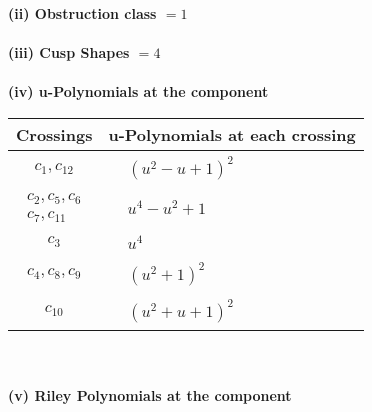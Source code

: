 \documentclass[1p]{elsarticle_modified}
\theoremstyle{definition}
\begin{document}
\flushleft \textbf{(ii) Obstruction class $= 1$}\\~\\
\flushleft \textbf{(iii) Cusp Shapes $= 4$}\\~\\
\newpage\renewcommand{\arraystretch}{1}
\flushleft \textbf{(iv) u-Polynomials at the component}\newline \\
\begin{tabular}{m{50pt}|m{274pt}}
Crossings & \hspace{64pt}u-Polynomials at each crossing \\
\hline $$\begin{aligned}c_{1},c_{12}\end{aligned}$$&$\begin{aligned}
&(u^2- u+1)^2
\end{aligned}$\\
\hline $$\begin{aligned}c_{2},c_{5},c_{6}\\c_{7},c_{11}\end{aligned}$$&$\begin{aligned}
&u^4- u^2+1
\end{aligned}$\\
\hline $$\begin{aligned}c_{3}\end{aligned}$$&$\begin{aligned}
&u^4
\end{aligned}$\\
\hline $$\begin{aligned}c_{4},c_{8},c_{9}\end{aligned}$$&$\begin{aligned}
&(u^2+1)^2
\end{aligned}$\\
\hline $$\begin{aligned}c_{10}\end{aligned}$$&$\begin{aligned}
&(u^2+u+1)^2
\end{aligned}$\\
\hline
\end{tabular}\\~\\
\newpage\renewcommand{\arraystretch}{1}
\flushleft \textbf{(v) Riley Polynomials at the component}\newline \\
\end{document}
